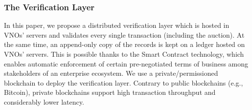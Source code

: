 \subsubsection{The Verification Layer}
In this paper, we propose a distributed verification layer which is hosted in \acp{VNO}' servers and validates every single transaction (including the auction). At the same time, an append-only copy of the records is kept on a ledger hosted on \acp{VNO}' servers. This is possible thanks to the Smart Contract technology, which enables automatic enforcement of certain pre-negotiated terms of business among stakeholders of an enterprise ecosystem.
We use a private/permissioned blockchain to deploy the verification layer. Contrary to public blockchains (e.g., Bitcoin), private blockchains support high transaction throughput and considerably lower latency. 




